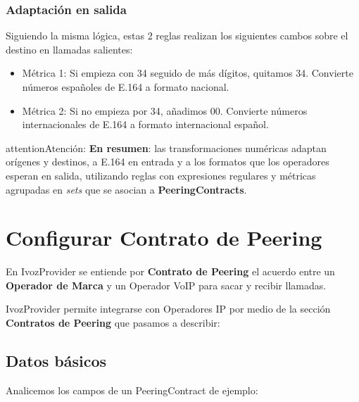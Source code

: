 \documentclass[letterpaper,10pt,spanish]{sphinxmanual}
\begin{document}
\subsubsection{Adaptación en salida}
\label{external_incoming_calls/numeric_transformations:id2}
\noindent{}

Siguiendo la misma lógica, estas 2 reglas realizan los siguientes cambos sobre el destino en llamadas salientes:
\begin{itemize}
\item {} 
Métrica 1: Si empieza con 34 seguido de más dígitos, quitamos 34. Convierte números españoles de E.164 a formato nacional.

\item {} 
Métrica 2: Si no empieza por 34, añadimos 00. Convierte números internacionales de E.164 a formato internacional español.

\end{itemize}

\begin{notice}{attention}{Atención:}
\textbf{En resumen}: las transformaciones numéricas adaptan orígenes y destinos, a E.164 en entrada y a los formatos que los operadores esperan en salida, utilizando reglas con expresiones regulares y métricas agrupadas en \emph{sets} que se asocian a \textbf{PeeringContracts}.
\end{notice}


\section{Configurar Contrato de Peering}
\label{external_incoming_calls/peering_contracts:configurar-contrato-de-peering}\label{external_incoming_calls/peering_contracts::doc}\label{external_incoming_calls/peering_contracts:peering-contracts}
En IvozProvider se entiende por \textbf{Contrato de Peering} el acuerdo entre un \textbf{Operador de Marca} y un Operador VoIP para sacar y recibir llamadas.

IvozProvider permite integrarse con Operadores IP por medio de la sección \textbf{Contratos de Peering} que pasamos a describir:



\subsection{Datos básicos}
\label{external_incoming_calls/peering_contracts:datos-basicos}
Analicemos los campos de un PeeringContract de ejemplo:
\end{document}
